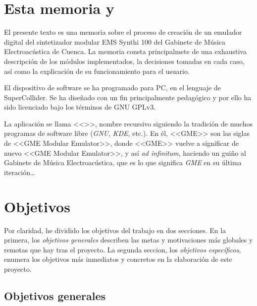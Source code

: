 \section{Esta memoria y \appName}

El presente texto es una memoria sobre el proceso de creación de un emulador digital del sintetizador modular EMS Synthi 100 del Gabinete de Música Electroacústica de Cuenca. La memoria consta principalmete de una exhaustiva descripción de los módulos implementados, la decisiones tomadas en cada caso, así como la explicación de su funcionamiento para el usuario.

El dispositivo de software se ha programado para PC, en el lenguaje de SuperCollider. Se ha diseñado con un fin principalmente pedagógico y por ello ha sido licenciado bajo los términos de GNU GPLv3. 

La aplicación se llama <<\appName>>, nombre recursivo siguiendo la tradición de muchos programas de software libre (\textit{GNU}, \textit{KDE}, etc.). En él, <<GME>> son las siglas de <<GME Modular Emulator>>, donde <<GME>> vuelve a significar de nuevo <<GME Modular Emulator>>, y así \textit{ad infinitum}, haciendo un guiño al Gabinete de Música Electroacústica, que es lo que significa \textit{GME} en su última iteración\dots


\section{Objetivos}
\label{sec:objetivos}

Por claridad, he dividido los objetivos del trabajo en dos secciones. En la primera, los \textit{objetivos generales} describen las metas y motivaciones más globales y remotas que hay tras el proyecto. La segunda seccion, los \textit{objetivos específicos}, enumera los objetivos más inmediatos y concretos en la elaboración de este proyecto.


\subsection{Objetivos generales}


